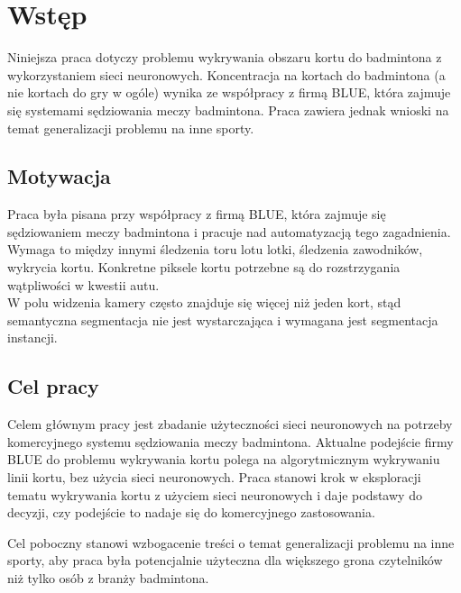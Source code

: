 \chapter{Wstęp}

Niniejsza praca dotyczy problemu wykrywania obszaru kortu do badmintona z wykorzystaniem sieci neuronowych.
Koncentracja na kortach do badmintona (a nie kortach do gry w ogóle) wynika ze współpracy z firmą BLUE, która zajmuje się systemami sędziowania meczy badmintona. Praca zawiera jednak wnioski na temat generalizacji problemu na inne sporty.

\section{Motywacja}

Praca była pisana przy współpracy z firmą BLUE, która zajmuje się sędziowaniem meczy badmintona i pracuje nad automatyzacją tego zagadnienia. Wymaga to między innymi śledzenia toru lotu lotki, śledzenia zawodników, wykrycia kortu. Konkretne piksele kortu potrzebne są do rozstrzygania wątpliwości w kwestii autu. \\

W polu widzenia kamery często znajduje się więcej niż jeden kort, stąd semantyczna segmentacja nie jest wystarczająca i wymagana jest segmentacja instancji.

\section{Cel pracy}

Celem głównym pracy jest zbadanie użyteczności sieci neuronowych na potrzeby komercyjnego systemu sędziowania meczy badmintona. Aktualne podejście firmy BLUE do problemu wykrywania kortu polega na algorytmicznym wykrywaniu linii kortu, bez użycia sieci neuronowych. Praca stanowi krok w eksploracji tematu wykrywania kortu z użyciem sieci neuronowych i daje podstawy do decyzji, czy podejście to nadaje się do komercyjnego zastosowania.

Cel poboczny stanowi wzbogacenie treści o temat generalizacji problemu na inne sporty, aby praca była potencjalnie użyteczna dla większego grona czytelników niż tylko osób z branży badmintona.


